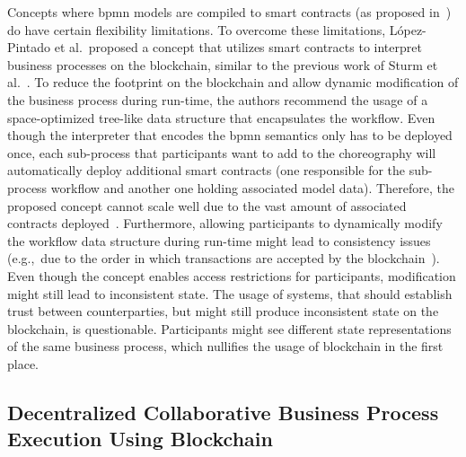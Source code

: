 Concepts where \gls{bpmn} models are compiled to smart contracts (as proposed in~\cite{untrusted_bp_execution_using_blockchain,bo_collaboration_between_healthcare_providers_covid_19,blockchain_based_information_sharing_in_io_workflows}) do have certain flexibility limitations. To overcome these limitations, López-Pintado et al.\ proposed a concept that utilizes smart contracts to interpret business processes on the blockchain, similar to the previous work of Sturm et al.~\cite{lean_architecture_for_blockchain_based_process_execution}. To reduce the footprint on the blockchain and allow dynamic modification of the business process during run-time, the authors recommend the usage of a space-optimized tree-like data structure that encapsulates the workflow. Even though the interpreter that encodes the \gls{bpmn} semantics only has to be deployed once, each sub-process that participants want to add to the choreography will automatically deploy additional smart contracts (one responsible for the sub-process workflow and another one holding associated model data). Therefore, the proposed concept cannot scale well due to the vast amount of associated contracts deployed~\cite{interpreted_bp_on_blockchain_loukil}. Furthermore, allowing participants to dynamically modify the workflow data structure during run-time might lead to consistency issues (e.g.,\ due to the order in which transactions are accepted by the blockchain~\cite{nakamoto2009,ethereum_yellow_paper}). Even though the concept enables access restrictions for participants, modification might still lead to inconsistent state. The usage of systems, that should establish trust between counterparties, but might still produce inconsistent state on the blockchain, is questionable. Participants might see different state representations of the same business process, which nullifies the usage of blockchain in the first place.


\subsection{Decentralized Collaborative Business Process Execution Using Blockchain~\cite{interpreted_bp_on_blockchain_loukil}}

